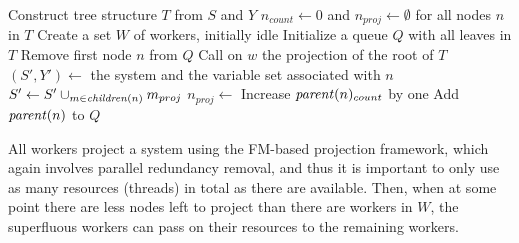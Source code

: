 \begin{algorithmic}
	\State Construct  tree structure $T$ from $S$ and $Y$
	\State $n_{count}\gets 0$ and $n_{proj}\gets\emptyset$ for all nodes $n$ in $T$
	\State Create a set $W$ of workers, initially idle
	\State Initialize a queue $Q$ with all leaves in $T$
			\State Remove first node $n$ from $Q$
			\State Call  on $w$
		\EndIf
	\EndWhile
	\State \Return the projection of the root of $T$
\EndFunction
\Statex
{}
	\State $(S',Y')\gets$ the system and the variable set associated with $n$
	\State $S'\gets S'\cup_{m\in \mathit{children}(n)} m_{proj}$ 
	\State $n_{proj}\gets$ 
	\State Increase $\mathit{parent}(n)_{count}$ by one
		\State Add $\mathit{parent}(n)$ to $Q$
	\EndIf
	\State \Return
\EndFunction
\end{algorithmic}	
All workers project a system using the FM-based projection framework, which again involves parallel redundancy removal, and thus it is important to only use as many resources (threads) in total as there are available.
Then, when at some point there are less nodes left to project than there are workers in $W$, the superfluous workers can pass on their resources to the remaining workers.  
%